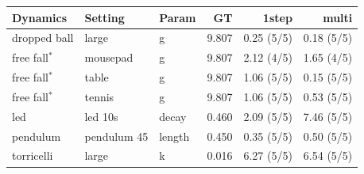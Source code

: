 \begin{tabular}{lll r r r}
\toprule
Dynamics & Setting & Param & GT & 1step & multi \\
\midrule
dropped ball & large & g & 9.807 & 0.25 (5/5) & 0.18 (5/5) \\
free fall$^\ast$ & mousepad & g & 9.807 & 2.12 (4/5) & 1.65 (4/5) \\
free fall$^\ast$ & table & g & 9.807 & 1.06 (5/5) & 0.15 (5/5) \\
free fall$^\ast$ & tennis & g & 9.807 & 1.06 (5/5) & 0.53 (5/5) \\
led & led 10s & decay & 0.460 & 2.09 (5/5) & 7.46 (5/5) \\
pendulum & pendulum 45 & length & 0.450 & 0.35 (5/5) & 0.50 (5/5) \\
torricelli & large & k & 0.016 & 6.27 (5/5) & 6.54 (5/5) \\
\bottomrule
\end{tabular}
